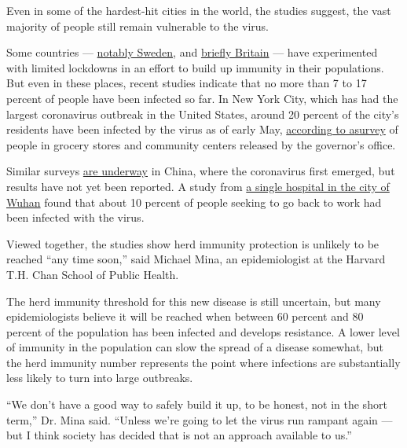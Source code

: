 Even in some of the hardest-hit cities in the world, the studies
suggest, the vast majority of people still remain vulnerable to the
virus.

Some countries ---
\href{https://www.nature.com/articles/d41586-020-01098-x}{notably
Sweden}, and
\href{https://www.nytimes3xbfgragh.onion/2020/03/13/world/europe/coronavirus-britain-boris-johnson.html}{briefly
Britain} --- have experimented with limited lockdowns in an effort to
build up immunity in their populations. But even in these places, recent
studies indicate that no more than 7 to 17 percent of people have been
infected so far. In New York City, which has had the largest coronavirus
outbreak in the United States, around 20 percent of the city's residents
have been infected by the virus as of early May,
\href{https://www.governor.ny.gov/news/amid-ongoing-covid-19-pandemic-governor-cuomo-announces-results-completed-antibody-testing}{according
to
a}\href{https://www.governor.ny.gov/news/amid-ongoing-covid-19-pandemic-governor-cuomo-announces-results-completed-antibody-testing}{}\href{https://www.governor.ny.gov/news/amid-ongoing-covid-19-pandemic-governor-cuomo-announces-results-completed-antibody-testing}{survey}
of people in grocery stores and community centers released by the
governor's office.

Similar surveys
\href{https://www.bloomberg.com/news/articles/2020-04-18/china-tests-thousands-to-calculate-true-spread-of-coronavirus}{are
underway} in China, where the coronavirus first emerged, but results
have not yet been reported. A study from
\href{https://onlinelibrary.wiley.com/doi/epdf/10.1002/jmv.25904}{a
single hospital in the city of Wuhan} found that about 10 percent of
people seeking to go back to work had been infected with the virus.

Viewed together, the studies show herd immunity protection is unlikely
to be reached ``any time soon,'' said Michael Mina, an epidemiologist at
the Harvard T.H. Chan School of Public Health.

The herd immunity threshold for this new disease is still uncertain, but
many epidemiologists believe it will be reached when between 60 percent
and 80 percent of the population has been infected and develops
resistance. A lower level of immunity in the population can slow the
spread of a disease somewhat, but the herd immunity number represents
the point where infections are substantially less likely to turn into
large outbreaks.

``We don't have a good way to safely build it up, to be honest, not in
the short term,'' Dr. Mina said. ``Unless we're going to let the virus
run rampant again --- but I think society has decided that is not an
approach available to us.''

